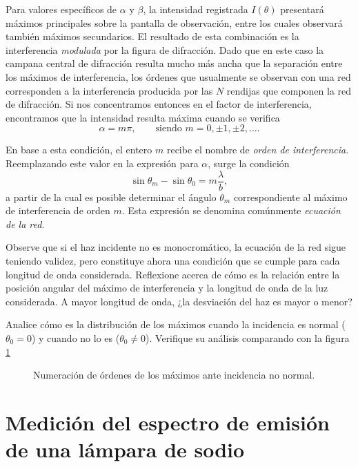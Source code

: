 \documentclass[laboratorio]{guia}
\begin{document}
Para valores específicos de \(\alpha\) y \(\beta\), la intensidad registrada \(I(\theta)\) presentará máximos principales sobre la pantalla de observación, entre los cuales observará también máximos secundarios.
El resultado de esta combinación es la interferencia \emph{modulada} por la figura de difracción.
Dado que en este caso la campana central de difracción resulta mucho más ancha que la separación entre los máximos de interferencia, los órdenes que usualmente se observan con una red corresponden a la interferencia producida por las \(N\) rendijas que componen
la red de difracción.
Si nos concentramos entonces en el factor de interferencia, encontramos que la intensidad resulta máxima cuando se verifica
\begin{equation}
  \alpha = m \pi, \quad \quad \text{siendo } m = 0, \pm 1, \pm 2, \ldots.
\end{equation}

En base a esta condición, el entero \(m\) recibe el nombre de \emph{orden de interferencia}.
Reemplazando este valor en la expresión para \(\alpha\), surge la condición
\begin{equation}
  \sin \theta_m - \sin \theta_0 = m \frac{\lambda}{b},
\end{equation}
a partir de la cual es posible determinar el ángulo \(\theta_m\) correspondiente al máximo de interferencia de orden \(m\).
Esta expresión se denomina comúnmente \emph{ecuación de la red}. 

Observe que si el haz incidente no es monocromático, la ecuación de la red sigue teniendo validez, pero constituye ahora una condición que se cumple para cada longitud de onda considerada.
Reflexione acerca de cómo es la relación entre la posición angular del máximo de interferencia y la longitud de onda de la luz considerada.
A mayor longitud de onda, ¿la desviación del haz es mayor o menor?

Analice cómo es la distribución de los máximos cuando la incidencia es normal (\(\theta_0 = 0\)) y cuando no lo es (\(\theta_0 \neq 0\)).
Verifique su análisis comparando con la figura \ref{fig:ordenes} 
\begin{figure}
  \centering
  \def\svgwidth{\columnwidth}
  
  \caption{Numeración de órdenes de los máximos ante incidencia no normal.}
  \label{fig:ordenes}
\end{figure}


\section{Medición del espectro de emisión de una lámpara de sodio}
\end{document}
